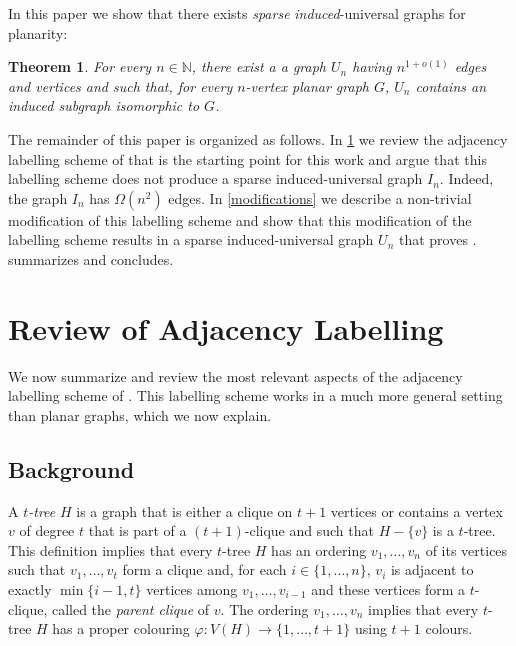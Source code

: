 \documentclass{patmorin}
\newcommand{\N}{\mathbb{N}}
\newtheorem{theorem}{Theorem}
\begin{document}
In this paper we show that there exists \emph{sparse} \emph{induced}-universal graphs for planarity:

\begin{theorem}\label{main-planar}
    For every $n\in\N$, there exist a a graph $U_n$ having $n^{1+o(1)}$ edges and vertices and such that, for every $n$-vertex planar graph $G$, $U_n$ contains an induced subgraph isomorphic to $G$.
\end{theorem}

The remainder of this paper is organized as follows. In \cref{review} we review the adjacency labelling scheme of \cite{dujmovic.esperet.ea:adjacency} that is the starting point for this work and argue that this labelling scheme does not produce a sparse induced-universal graph $I_n$. Indeed, the graph $I_n$ has $\Omega(n^2)$ edges.  In \cref{modifications} we describe a non-trivial modification of this labelling scheme and show that this modification of the labelling scheme results in a sparse induced-universal graph $U_n$ that proves .   summarizes and concludes.



\section{Review of Adjacency Labelling}
\label{review}

We now summarize and review the most relevant aspects of the adjacency labelling scheme of \citet{dujmovic.esperet.ea:adjacency}.  This labelling scheme works in a much more general setting than planar graphs, which we now explain.

\subsection{Background}

A \emph{$t$-tree} $H$ is a graph that is either a clique on $t+1$ vertices or contains a vertex $v$ of degree $t$ that is part of a $(t+1)$-clique and such that $H-\{v\}$ is a $t$-tree.  This definition implies that every $t$-tree $H$ has an ordering $v_1,\ldots,v_n$ of its vertices such that $v_1,\ldots,v_t$ form a clique and, for each $i\in\{1,\ldots,n\}$, $v_i$ is adjacent to exactly $\min\{i-1,t\}$ vertices among $v_1,\ldots,v_{i-1}$ and these vertices form a $t$-clique, called the \emph{parent clique} of $v$.  The ordering $v_1,\ldots,v_n$ implies that every $t$-tree $H$ has a proper colouring $\varphi:V(H)\to\{1,\ldots,t+1\}$ using $t+1$ colours.
\end{document}
